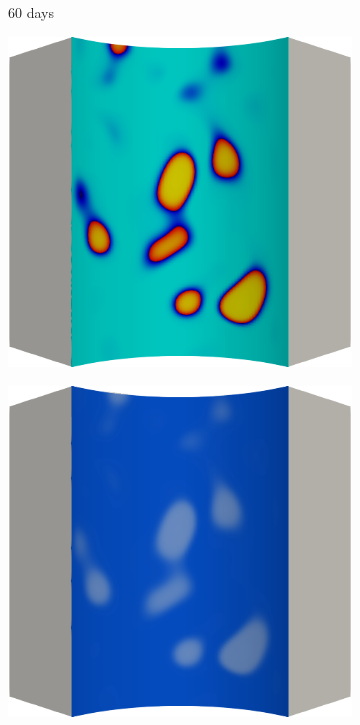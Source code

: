 \begin{figure}[!htbp]
  \begin{subfigure}{0.15\textwidth}
    \centering
    \caption*{60 days}
  \end{subfigure}
  \begin{subfigure}{0.19\textwidth}
    \centering
    \includegraphics[width=\textwidth]{Chapter5/figures/spallation/c.0006}
  \end{subfigure}
  \hspace{0.06\textwidth}
  \begin{subfigure}{0.19\textwidth}
    \centering
    \includegraphics[width=\textwidth]{Chapter5/figures/spallation/d.0006}

\end{subfigure}
\end{figure}
